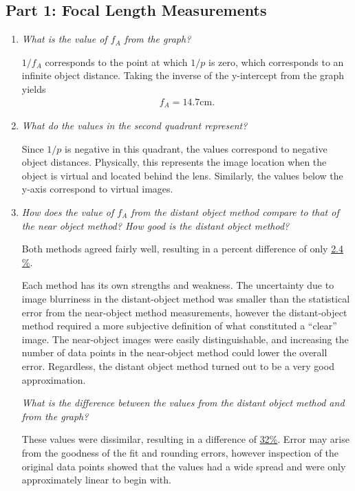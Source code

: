 \documentclass[twocolumn,english]{IEEEtran}
\theoremstyle{plain}
\theoremstyle{plain}
\begin{document}
\subsection{Part 1: Focal Length Measurements}
\begin{enumerate}
	\item \textit{What is the value of $f_A$ from the graph?}

	$1/f_A$ corresponds to the point at which $1/p$ is zero, which corresponds to an infinite object distance. Taking the inverse of the y-intercept from the graph yields
	\begin{align*}
		f_A = 14.7 \text{cm}.
	\end{align*}

	\item \textit{What do the values in the second quadrant represent?}

	Since $1/p$ is negative in this quadrant, the values correspond to negative object distances. Physically, this represents the image location when the object is virtual and located behind the lens. Similarly, the values below the y-axis correspond to virtual images.

	\item \textit{How does the value of $f_A$ from the distant object method compare to that of the near object method? How good is the distant object method?}

	Both methods agreed fairly well, resulting in a percent difference of only \underline{2.4 \%}.

	Each method has its own strengths and weakness. The uncertainty due to image blurriness in the distant-object method was smaller than the statistical error from the near-object method measurements, however the distant-object method required a more subjective definition of what constituted a ``clear'' image. The near-object images were easily distinguishable, and increasing the number of data points in the near-object method could lower the overall error. Regardless, the distant object method turned out to be a very good approximation.

	\textit{What is the difference between the values from the distant object method and from the graph?}

	These values were dissimilar, resulting in a difference of \underline{32\%}. Error may arise from the goodness of the fit and rounding errors, however inspection of the original data points showed that the values had a wide spread and were only approximately linear to begin with.
\end{enumerate}
\end{document}
